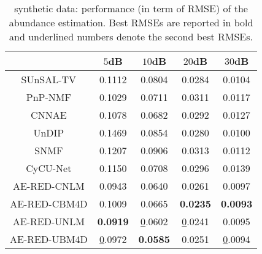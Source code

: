 \documentclass[journal,a4paper]{IEEEtran}
\begin{document}
\begin{table}[!t]
\centering
\renewcommand\arraystretch{1.5}
\caption{synthetic data: performance (in term of RMSE) of the abundance estimation. Best RMSEs are reported in bold and underlined numbers denote the second best RMSEs.}\label{Tab_syn_RMSE_results}
\begin{tabular}{c|c|c|c|c}
\hline\hline
            & $5$dB       & $10$dB      & $20$dB      & $30$dB      \\ \hline
SUnSAL-TV   & 0.1112          & 0.0804          & 0.0284          & 0.0104          \\ \hline
PnP-NMF     & 0.1029          & 0.0711          & 0.0311          & 0.0117          \\ \hline
CNNAE       & 0.1078          & 0.0682          & 0.0292          & 0.0127          \\ \hline
UnDIP       & 0.1469          & 0.0854          & 0.0280          & 0.0100          \\ \hline
SNMF        & 0.1207          & 0.0906          & 0.0313          & 0.0112          \\ \hline
CyCU-Net    & 0.1150          & 0.0708          & 0.0296          & 0.0139          \\ \hline
AE-RED-CNLM  & 0.0943          & 0.0640          & 0.0261          & 0.0097          \\ \hline
AE-RED-CBM4D & 0.1009          & 0.0665          & \textbf{0.0235} & \textbf{0.0093} \\ \hline
AE-RED-UNLM  & \textbf{0.0919} & {\ul 0.0602}    & {\ul 0.0241}    & 0.0095          \\ \hline
AE-RED-UBM4D & {\ul 0.0972}    & \textbf{0.0585} & 0.0251          & {\ul 0.0094}    \\ \hline\hline
\end{tabular}
\end{table}
\end{document}
